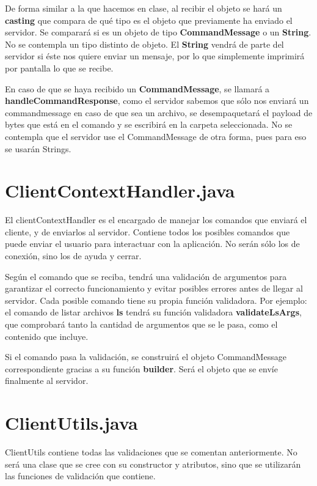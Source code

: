 \documentclass[a4paper, 12pt]{report}
\begin{document}
De forma similar a la que hacemos en clase, al recibir el objeto se hará un \textbf{casting} que compara de qué tipo es el objeto que previamente ha enviado el servidor. Se comparará si es un objeto de tipo \textbf{CommandMessage} o un \textbf{String}. No se contempla un tipo distinto de objeto. El \textbf{String} vendrá de parte del servidor si éste nos quiere enviar un mensaje, por lo que simplemente imprimirá por pantalla lo que se recibe.

En caso de que se haya recibido un \textbf{CommandMessage}, se llamará a \textbf{handleCommandResponse}, como el servidor sabemos que sólo nos enviará un commandmessage en caso de que sea un archivo, se desempaquetará el payload de bytes que está en el comando y se escribirá en la carpeta seleccionada. No se contempla que el servidor use el CommandMessage de otra forma, pues para eso se usarán Strings.

\section{ClientContextHandler.java}

El clientContextHandler es el encargado de manejar los comandos que enviará el cliente, y de enviarlos al
servidor. Contiene todos los posibles comandos que puede enviar el usuario para interactuar con la aplicación.
No serán sólo los de conexión, sino los de ayuda y cerrar.

Según el comando que se reciba, tendrá una validación de argumentos para garantizar el correcto funcionamiento y
evitar posibles errores antes de llegar al servidor. Cada posible comando tiene su propia función validadora.
Por ejemplo: el comando de listar archivos \textbf{ls} tendrá su función validadora \textbf{validateLsArgs}, que
comprobará tanto la cantidad de argumentos que se le pasa, como el contenido que incluye.

Si el comando pasa la validación, se construirá el objeto CommandMessage correspondiente gracias a su función \textbf{builder}. Será el objeto que se envíe finalmente al servidor.

\section{ClientUtils.java}

ClientUtils contiene todas las validaciones que se comentan anteriormente. No será una clase que se cree con su
constructor y atributos, sino que se utilizarán las funciones de validación que contiene.
\end{document}
